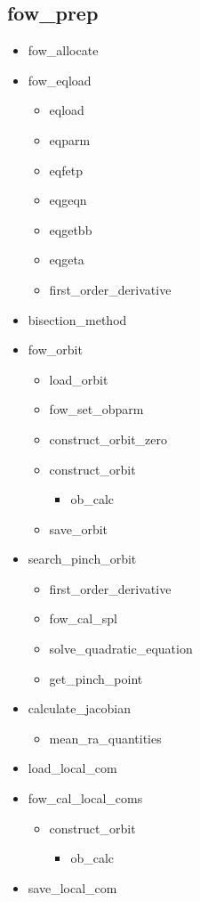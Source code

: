 \documentclass[11pt]{article}
\begin{document}
\subsection{fow\_prep}
  \begin{itemize}
  \item
    fow\_allocate
  \item
    fow\_eqload
    \begin{itemize}
    \item
      eqload
    \item
      eqparm
    \item
      eqfetp
    \item
      eqgeqn
    \item
      eqgetbb
    \item
      eqgeta
    \item
      first\_order\_derivative
    \end{itemize}
  \item
    bisection\_method
  \item
    fow\_orbit
    \begin{itemize}
    \item
      load\_orbit
    \item
      fow\_set\_obparm
    \item
      construct\_orbit\_zero
    \item
      construct\_orbit
      \begin{itemize}
      \item
        ob\_calc
      \end{itemize}
    \item
      save\_orbit
    \end{itemize}
  \item
    search\_pinch\_orbit
    \begin{itemize}
    \item
      first\_order\_derivative
    \item
      fow\_cal\_spl
    \item
      solve\_quadratic\_equation
    \item
      get\_pinch\_point
    \end{itemize}
  \item
    calculate\_jacobian
    \begin{itemize}
    \item
      mean\_ra\_quantities
    \end{itemize}
  \item
    load\_local\_com
  \item
    fow\_cal\_local\_coms
    \begin{itemize}
    \item
      construct\_orbit
      \begin{itemize}
      \item
        ob\_calc
      \end{itemize}
    \end{itemize}
  \item
    save\_local\_com
  \end{itemize}
\end{document}
